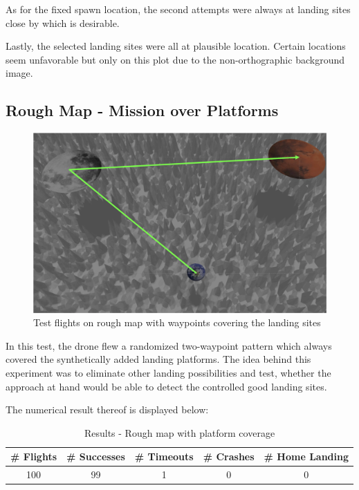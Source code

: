     As for the fixed spawn location, the second attempts were always at landing sites close by which is desirable.

    Lastly, the selected landing sites were all at plausible location. Certain locations seem unfavorable but only on this plot due to the non-orthographic background image.

\subsection{Rough Map - Mission over Platforms}\label{subsec:rough_coverage}
        \begin{figure}[h]
            \centering
            \includegraphics[scale=0.24]{images/evaluation/rough_over_platforms.png}
            \caption{Test flights on rough map with waypoints covering the landing sites}
            \label{fig:rough_covered}
        \end{figure}

        In this test, the drone flew a randomized two-waypoint pattern which always covered the synthetically added landing platforms. The idea behind this experiment was to eliminate other landing possibilities and test, whether the approach at hand would be able to detect the controlled good landing sites.

        The numerical result thereof is displayed below:

        \begin{table}[h]
            \begin{center}
             \caption{Results - Rough map with platform coverage}\vspace{1ex}
             \label{tab:result_rough_covered}
             \begin{tabular}{|c|c|c|c|c|}
             \hline
             \# Flights & \# Successes & \# Timeouts & \# Crashes & \# Home Landing\\ \hline \hline
             100 & 99 & 1 & 0 & 0 \\
             \hline
             \end{tabular}
            \end{center}
        \end{table}

